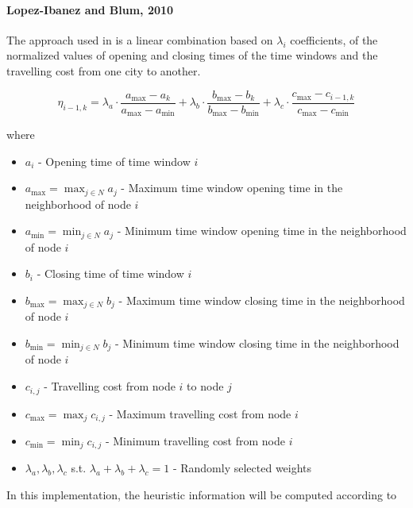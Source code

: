 \begin{homeworkProblem}
\paragraph{Lopez-Ibanez and Blum, 2010}
The approach used in \cite{lopez2010beam} is a linear combination based on $\lambda_i$ coefficients, of the normalized values of opening and closing times of the time windows and the travelling cost from one city to another.

\begin{equation} \label{eq:heuristic}
\eta_{i-1,k} = \lambda_{a} \cdot \frac{a_{\max}-a_{k}}{a_{\max}-a_{\min}} + \lambda_{b} \cdot \frac{b_{\max}-b_{k}}{b_{\max}-b_{\min}} + \lambda_{c} \cdot \frac{c_{\max}-c_{i-1,k}}{c_{\max}-c_{\min}}
\end{equation}

where
\begin{itemize}
  \item $a_i$ - Opening time of time window $i$
  \item $a_{\max} = \max_{j \in N} a_{j}$ - Maximum time window opening time in the neighborhood of node $i$
  \item $a_{\min} = \min_{j \in N} a_{j}$ - Minimum time window opening time in the neighborhood of node $i$
  \item $b_i$ - Closing time of time window $i$
  \item $b_{\max} = \max_{j \in N} b_{j}$ - Maximum time window closing time in the neighborhood of node $i$
  \item $b_{\min} = \min_{j \in N} b_{j}$ - Minimum time window closing time in the neighborhood of node $i$
  \item $c_{i,j}$ - Travelling cost from node $i$ to node $j$
  \item $c_{\max} = \max_j c_{i,j}$ - Maximum travelling cost from node $i$ 
  \item $c_{\min} = \min_j c_{i,j}$ - Minimum travelling cost from node $i$
  \item $\lambda_{a},\lambda_{b},\lambda_{c}$ s.t. $\lambda_{a}+\lambda_{b}+\lambda_{c}=1$ - Randomly selected weights
\end{itemize}

In this implementation, the heuristic information will be computed according to \cite{lopez2010beam}


\end{homeworkProblem}
